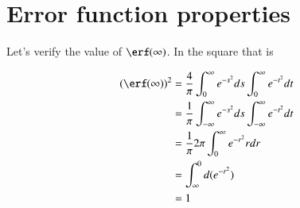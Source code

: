 \label{chap:appendix:specialFunctions}
\section{Error function properties}

Let's verify the value of $\erf(\infty)$.  In the square that is

\begin{align*}
(\erf(\infty))^2 
&=
\frac{4}{\pi} 
\int_0^\infty e^{-s^2} ds
\int_0^\infty e^{-t^2} dt \\
&=
\frac{1}{\pi} 
\int_{-\infty}^\infty e^{-s^2} ds
\int_{-\infty}^\infty e^{-t^2} dt \\
&=
\frac{1}{\pi} 2 \pi
\int_{0}^\infty e^{-r^2} r dr \\
&=
\int_\infty^0 d( e^{-r^2} ) \\
&= 1
\end{align*}
